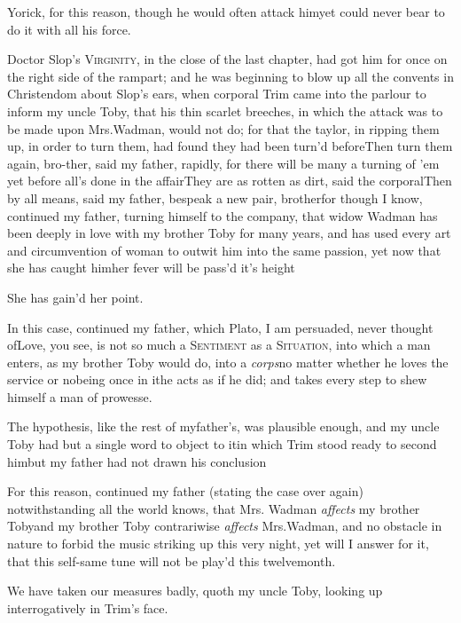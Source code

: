 \documentclass{article}
\begin{document}
Yorick, for this reason, though he would often attack
him\tsk yet could never bear to do it with all his force.

Doctor Slop’s \textsc{Virginity}, in the
close of the last chapter, had got him for once on the right side
of the rampart; and he was beginning to blow up all the convents in
Christendom about Slop’s ears, when corporal
Trim came into the parlour to inform my uncle Toby,
that his thin scarlet breeches, in which the attack was to be made
upon Mrs.\@ Wadman, would not do; for that the taylor, in
ripping them up, in order to turn them, had found they had been
turn’d before\tsh Then turn them again, bro-\break ther,
said my father, rapidly, for there will be many a turning of
’em yet before all’s done in the
affair\tsh They are as rotten as dirt, said the
corporal\tsh\break Then by all means, said my father, bespeak a
new pair, brother\tsh for though I know, continued my
father, turning himself to the company, that widow Wadman
has been deeply in love with my brother Toby for many years,
and has used every art and circumvention of woman to outwit him
into the same passion, yet now that she has caught
him\tsh her fever will be pass’d it’s\sic\break
height\tsh

\tsh She has gain’d her point.

In this case, continued my father, which Plato, I am
persuaded, never thought of\tsh Love, you see, is not so
much a \textsc{Sentiment} as a \textsc{Situation}, into
which a man enters, as my brother Toby would do, into a
\textit{corps}\tsh no matter whether he loves the service or
no\tsh being once in it\tsk he acts as if he did; and
takes every step to shew himself a man of prowesse.

The hypothesis, like the rest of my\break father’s, was
plausible enough, and my uncle Toby had but a single word to
object to it\tsk in which Trim stood ready to second
him\tsh but my father had not drawn his
conclusion\tsh

For this reason, continued my father (stating the case over
again) notwithstanding all the world knows, that Mrs.
Wadman \textit{affects} my brother Toby\tsk and my brother
Toby contrariwise \textit{affects} Mrs.\@ Wadman, and no
obstacle in nature to forbid the music striking up this very night,
yet will I answer for it, that this self-same tune will not be
play’d this twelvemonth.

We have taken our measures badly, quoth my uncle Toby,
looking up interrogatively in Trim’s face.
\end{document}
